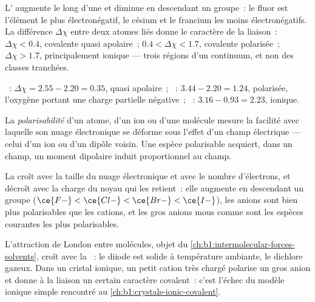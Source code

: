 \begin{proposition}\label{prop:b1:periodicity:en-trend}
L' augmente le long d'une  et diminue en
descendant un groupe~: le fluor est l'élément le plus électronégatif, le
césium et le francium les moins électronégatifs. La différence
$\Delta\chi$ entre deux atomes liés donne le caractère de la liaison~:
$\Delta\chi < 0.4$, covalente quasi apolaire~; $0.4 < \Delta\chi < 1.7$,
covalente polarisée~; $\Delta\chi > 1.7$, principalement ionique ---
trois régions d'un continuum, et non des classes tranchées.
\end{proposition}

\begin{example}\label{ex:b1:periodicity:bonds}
~: $\Delta\chi = 2.55 - 2.20 = 0.35$, quasi apolaire~;
~: $3.44 - 2.20 = 1.24$, polarisée, l'oxygène portant une
charge partielle négative~; ~: $3.16 - 0.93 = 2.23$, ionique.
\end{example}

\begin{definition}[Polarisabilité]\label{def:b1:periodicity:polarisability}
La \emph{polarisabilité} d'un atome, d'un ion ou d'une
molécule mesure la facilité avec laquelle son nuage électronique se
déforme sous l'effet d'un champ électrique --- celui d'un ion ou d'un
dipôle voisin. Une espèce polarisable acquiert, dans un champ, un moment
dipolaire induit proportionnel au champ.
\end{definition}

\begin{proposition}\label{prop:b1:periodicity:polarisability-trend}
La  croît avec la taille du nuage électronique et avec le
nombre d'électrons, et décroît avec la charge du noyau qui les retient~:
elle augmente en descendant un groupe ($\ce{F-} < \ce{Cl-} < \ce{Br-} <
\ce{I-}$), les anions sont bien plus polarisables que les cations, et
les gros anions mous comme  sont les espèces courantes les plus
polarisables.
\end{proposition}

\begin{example}\label{ex:b1:periodicity:pol}
L'attraction de London entre molécules, objet du
\cref{ch:b1:intermolecular-forces-solvents}, croît avec la
~: le diiode est solide à température ambiante, le
dichlore gazeux. Dans un cristal ionique, un petit cation très chargé
polarise un gros anion et donne à la liaison un certain caractère
covalent~: c'est l'échec du modèle ionique simple rencontré au
\cref{ch:b1:crystals-ionic-covalent}.
\end{example}


